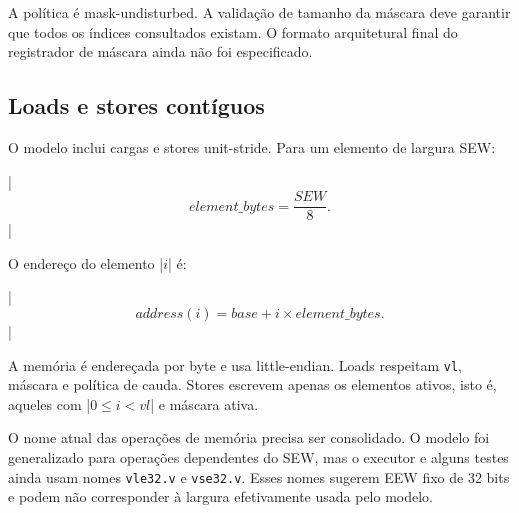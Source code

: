 A política é mask-undisturbed. A validação de tamanho da máscara deve
garantir que todos os índices consultados existam. O formato arquitetural
final do registrador de máscara ainda não foi especificado.

\subsection{Loads e stores contíguos}

O modelo inclui cargas e stores unit-stride. Para um elemento de largura
SEW:

|$$
element\_bytes = \frac{SEW}{8}.
$$|

O endereço do elemento |$i$| é:

|$$
address(i) = base + i \times element\_bytes.
$$|

A memória é endereçada por byte e usa little-endian. Loads respeitam
\texttt{vl}, máscara e política de cauda. Stores escrevem apenas os
elementos ativos, isto é, aqueles com |$0 \leq i < vl$| e máscara ativa.

O nome atual das operações de memória precisa ser consolidado. O modelo
foi generalizado para operações dependentes do SEW, mas o executor e
alguns testes ainda usam nomes \texttt{vle32.v} e \texttt{vse32.v}.
Esses nomes sugerem EEW fixo de 32 bits e podem não corresponder à
largura efetivamente usada pelo modelo.